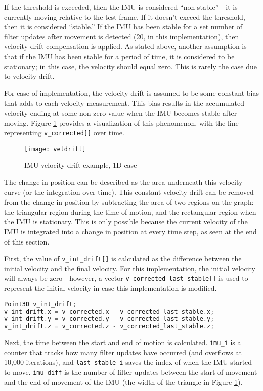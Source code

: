 \documentclass[12pt,a4paper]{report}
\begin{document}
If the threshold is exceeded, then the IMU is considered “non-stable” - it is currently moving relative to the test frame. If it doesn’t exceed the threshold, then it is considered “stable.” If the IMU has been stable for a set number of filter updates after movement is detected (20, in this implementation), then velocity drift compensation is applied. As stated above, another assumption is that if the IMU has been stable for a period of time, it is considered to be stationary; in this case, the velocity should equal zero. This is rarely the case due to velocity drift.

For ease of implementation, the velocity drift is assumed to be some constant bias that adds to each velocity measurement. This bias results in the accumulated velocity ending at some non-zero value when the IMU becomes stable after moving. Figure \ref{fig:veldrift} provides a visualization of this phenomenon, with the line representing \verb|v_corrected[]| over time.

\begin{figure}[htbp]
	\centering
	\texttt{[image: veldrift]}
	\caption{IMU velocity drift example, 1D case}
	\label{fig:veldrift}
\end{figure}

The change in position can be described as the area underneath this velocity curve (or the integration over time). This constant velocity drift can be removed from the change in position by subtracting the area of two regions on the graph: the triangular region during the time of motion, and the rectangular region when the IMU is stationary. This is only possible because the current velocity of the IMU is integrated into a change in position at every time step, as seen at the end of this section.

First, the value of \verb|v_int_drift[]| is calculated as the difference between the initial velocity and the final velocity. For this implementation, the initial velocity will always be zero - however, a vector \verb|v_corrected_last_stable[]| is used to represent the initial velocity in case this implementation is modified.

\begin{lstlisting}[language=C++]
Point3D v_int_drift;
v_int_drift.x = v_corrected.x - v_corrected_last_stable.x;
v_int_drift.y = v_corrected.y - v_corrected_last_stable.y;
v_int_drift.z = v_corrected.z - v_corrected_last_stable.z;
\end{lstlisting}

Next, the time between the start and end of motion is calculated. \verb|imu_i| is a counter that tracks how many filter updates have occurred (and overflows at 10,000 iterations), and \verb|last_stable_i| saves the index of when the IMU started to move. \verb|imu_diff| is the number of filter updates between the start of movement and the end of movement of the IMU (the width of the triangle in Figure \ref{fig:veldrift}).
\end{document}
